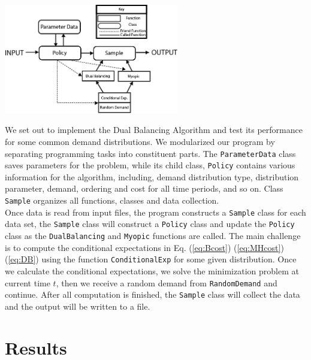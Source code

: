 \documentclass[twoside]{article}
\begin{document}
\begin{multicols}{2}
\begin{center}
  \label{figure:software_diagram}
  \includegraphics[width=3.0in]{software_diagram.png}
\end{center}
We set out to implement the Dual Balancing Algorithm and test its performance for some common demand distributions. We modularized our program by separating programming tasks into constituent parts. The \texttt{ParameterData} class saves parameters for the problem, while its child class, \texttt{Policy} contains various information for the algorithm, including, demand distribution type, distribution parameter, demand, ordering and cost for all time periods, and so on. Class \texttt{Sample} organizes all functions, classes and data collection.\\
Once data is read from input files, the program constructs a \texttt{Sample} class for each data set, the \texttt{Sample} class will construct a \texttt{Policy} class and update the \texttt{Policy} class as the \texttt{DualBalancing} and \texttt{Myopic} functions are called. The main challenge is to compute the conditional expectations in Eq. (\ref{eq:Bcost}) (\ref{eq:MHcost}) (\ref{eq:DB}) using the function \texttt{ConditionalExp} for some given distribution. Once we calculate the conditional expectations, we solve the minimization problem at current time $t$, then we receive a random demand from \texttt{RandomDemand} and continue. After all computation is finished, the \texttt{Sample} class will collect the data and the output will be written to a file.

\section{Results}


\end{multicols}
\end{document}
